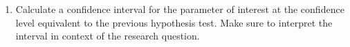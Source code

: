 \documentclass[12pt]{article}
\newcommand{\soln}[2]{$\:$\\ \vspace{#1}}{}
\begin{document}
\begin{enumerate}
\begin{enumerate}
\item Calculate a confidence interval for the parameter of interest at the confidence level equivalent to the 
previous hypothesis test. Make sure to interpret the interval in context of the research question.

\soln{5cm}{
$(55,890 - 29,240) \pm 1.97 \times 3,579.318 = (19,598.74, 33,701.26)$
We are 95\% confident that men on average make 19,598.74 to 33,701.2 more than women.
}

\end{enumerate}

\end{enumerate}

\end{document}
